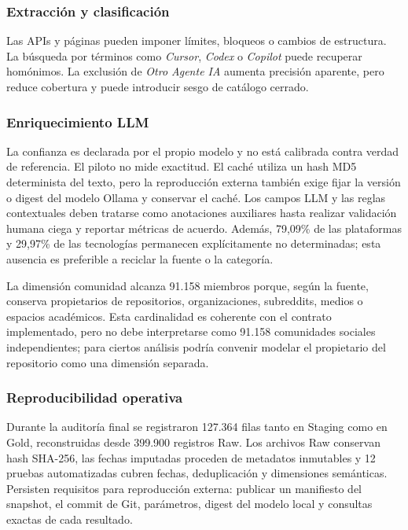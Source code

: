 \documentclass[12pt,a4paper]{article}
\begin{document}
\subsubsection{Extracción y clasificación}

Las APIs y páginas pueden imponer límites, bloqueos o cambios de estructura. La búsqueda por términos como \emph{Cursor}, \emph{Codex} o \emph{Copilot} puede recuperar homónimos. La exclusión de \emph{Otro Agente IA} aumenta precisión aparente, pero reduce cobertura y puede introducir sesgo de catálogo cerrado.

\subsubsection{Enriquecimiento LLM}

La confianza es declarada por el propio modelo y no está calibrada contra verdad de referencia. El piloto no mide exactitud. El caché utiliza un hash MD5 determinista del texto, pero la reproducción externa también exige fijar la versión o digest del modelo Ollama y conservar el caché. Los campos LLM y las reglas contextuales deben tratarse como anotaciones auxiliares hasta realizar validación humana ciega y reportar métricas de acuerdo. Además, 79,09\% de las plataformas y 29,97\% de las tecnologías permanecen explícitamente no determinadas; esta ausencia es preferible a reciclar la fuente o la categoría.

La dimensión comunidad alcanza 91.158 miembros porque, según la fuente, conserva propietarios de repositorios, organizaciones, subreddits, medios o espacios académicos. Esta cardinalidad es coherente con el contrato implementado, pero no debe interpretarse como 91.158 comunidades sociales independientes; para ciertos análisis podría convenir modelar el propietario del repositorio como una dimensión separada.

\subsubsection{Reproducibilidad operativa}

Durante la auditoría final se registraron 127.364 filas tanto en Staging como en Gold, reconstruidas desde 399.900 registros Raw. Los archivos Raw conservan hash SHA-256, las fechas imputadas proceden de metadatos inmutables y 12 pruebas automatizadas cubren fechas, deduplicación y dimensiones semánticas. Persisten requisitos para reproducción externa: publicar un manifiesto del snapshot, el commit de Git, parámetros, digest del modelo local y consultas exactas de cada resultado.
\end{document}

